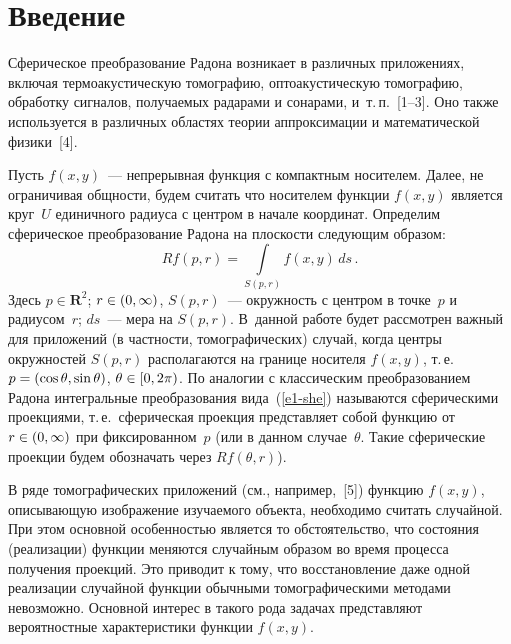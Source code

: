 

      \thispagestyle{headings}

      \begin{multicols}{2}

            \label{st\stat}


\section{Введение}

Сферическое преобразование Радона возникает в различных приложениях,
включая термоакустическую томографию, оптоакустическую томографию,
обработку сигналов, получаемых радарами и сонарами, и~т.\,п.~[1--3].
Оно также используется в различных областях теории аппроксимации и
математической физики~[4].

Пусть $f(x,y)$~--- непрерывная функция с компактным носителем.
Далее, не ограничивая общности, будем считать что носителем функции
$f(x,y)$ является круг~$U$ единичного радиуса с центром в начале
координат. Определим сферическое преобразование Радона на плоскости
следующим образом:
\begin{equation}
Rf(p,r)=\int\limits_{S(p,r)}f(x,y)\,ds\,.\label{e1-she}
\end{equation}
Здесь $p\in \mathbf{R}^2$; $r\hm\in(0,\infty)$, $S(p,r)$~--- окружность
с центром в точке~$p$ и радиусом~$r$;  $ds$~--- мера на $S(p,r)$. 
В~данной работе будет рассмотрен важный для приложений (в частности,
томографических) случай, когда центры окружностей $S(p,r)$
располагаются на границе носителя $f(x,y)$, т.\,е.\
$p\hm=(\cos\theta,\sin\theta)$, $\theta\hm\in[0,2\pi)$. По аналогии с
классическим преобразованием Радона интегральные преобразования вида~(\ref{e1-she}) 
называются сферическими проекциями, т.\,е.\ сферическая проекция
представляет собой функцию от $r\hm\in(0,\infty)$ при фиксированном~$p$
(или в данном случае~$\theta$. Такие сферические проекции будем
обозначать через $Rf(\theta,r)$).

В ряде томографических приложений (см., например,~[5]) функцию
$f(x,y)$, описывающую изоб\-ра\-же\-ние изучаемого объекта, необходимо
считать случайной. При этом основной особенностью является то
обстоятельство, что состояния (реализации) функции меняются
случайным образом во время процесса получения проекций. Это приводит
к тому, что восстановление даже одной реализации случайной функции
обычными томографическими методами невозможно. Основной интерес в
такого рода задачах представляют вероятностные характеристики
функции $f(x,y)$.


\end{multicols}
